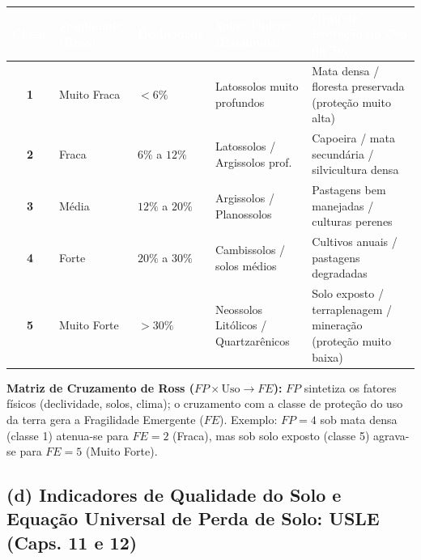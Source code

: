 \vspace{4pt}
\begin{center}
\renewcommand{\arraystretch}{1.20}
\small
\begin{tabularx}{\textwidth}{@{}c p{2.3cm} p{2.3cm} p{3.5cm} >{\raggedright\arraybackslash}X@{}}
  \toprule
  \rowcolor{uefsTeal}
  \textcolor{white}{\bfseries Classe} & \textcolor{white}{\bfseries Fragilidade (Ross)} & \textcolor{white}{\bfseries Declividade} & \textcolor{white}{\bfseries Solos Típicos (Exemplos)} & \textcolor{white}{\bfseries Grau de Proteção do Uso da Terra} \\
  \midrule
  \textbf{1} & Muito Fraca & $< 6\%$ & Latossolos muito profundos & Mata densa / floresta preservada (proteção muito alta) \\
  \rowcolor{bgGray}
  \textbf{2} & Fraca & $6\%$ a $12\%$ & Latossolos / Argissolos prof. & Capoeira / mata secundária / silvicultura densa \\
  \textbf{3} & Média & $12\%$ a $20\%$ & Argissolos / Planossolos & Pastagens bem manejadas / culturas perenes \\
  \rowcolor{bgGray}
  \textbf{4} & Forte & $20\%$ a $30\%$ & Cambissolos / solos médios & Cultivos anuais / pastagens degradadas \\
  \textbf{5} & Muito Forte & $> 30\%$ & Neossolos Litólicos / Quartzarênicos & Solo exposto / terraplenagem / mineração (proteção muito baixa) \\
  \bottomrule
\end{tabularx}
\end{center}

\noindent\textbf{Matriz de Cruzamento de Ross ($FP \times \text{Uso} \to FE$):} $FP$ sintetiza os fatores físicos (declividade, solos, clima); o cruzamento com a classe de proteção do uso da terra gera a Fragilidade Emergente ($FE$). Exemplo: $FP = 4$ sob mata densa (classe 1) atenua-se para $FE = 2$ (Fraca), mas sob solo exposto (classe 5) agrava-se para $FE = 5$ (Muito Forte).

\subsection*{(d) Indicadores de Qualidade do Solo e Equação Universal de Perda de Solo: USLE (Caps. 11 e 12)}

